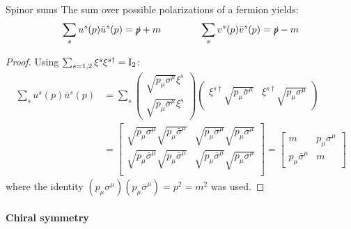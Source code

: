 \begin{proposition}{Spinor sums}{}
  The sum over possible polarizations of a fermion yields:
  \begin{equation}
    \sum_s u^s(p) \bar{u}^s(p) = \slashed{p} + m
    \qquad \qquad
    \sum_s v^s(p) \bar{v}^s(p) = \slashed{p} - m
    \label{eq:spinor-sums}
  \end{equation}
\end{proposition}

\begin{proofbox}
  \begin{proof}
    Using $ \sum_{s = 1,2} \xi^s \xi^{s \dagger} = \mathrm{I}_2 $:
    \begin{equation*}
      \begin{split}
        \sum_s u^s(p) \bar{u}^s(p)
        &= \sum_s
        \begin{pmatrix} \sqrt{p_\mu \sigma^\mu} \xi^s \\ \sqrt{p_\mu \bar{\sigma}^\mu} \xi^s \end{pmatrix}
        \begin{pmatrix} \xi^{s \dagger} \sqrt{p_\mu \bar{\sigma}^\mu} & \xi^{s \dagger} \sqrt{p_\mu \sigma^\mu} \end{pmatrix} \\
        &=
        \begin{bmatrix}
          \sqrt{p_\mu \sigma^\mu} \sqrt{p_\mu \bar{\sigma}^\mu} & \sqrt{p_\mu \sigma^\mu} \sqrt{p_\mu \sigma^\mu} \\
          \sqrt{p_\mu \bar{\sigma}^\mu} \sqrt{p_\mu \bar{\sigma}^\mu} & \sqrt{p_\mu \bar{\sigma}^\mu} \sqrt{p_\mu \sigma^\mu} \\
        \end{bmatrix}
        =
        \begin{bmatrix}
          m & p_\mu \sigma^\mu \\ p_\mu \bar{\sigma}^\mu & m
        \end{bmatrix}
      \end{split}
    \end{equation*}
    where the identity $ (p_\mu \sigma^\mu) (p_\mu \bar{\sigma}^\mu) = p^2 = m^2 $ was used.
  \end{proof}
\end{proofbox}

\paragraph{Chiral symmetry}

